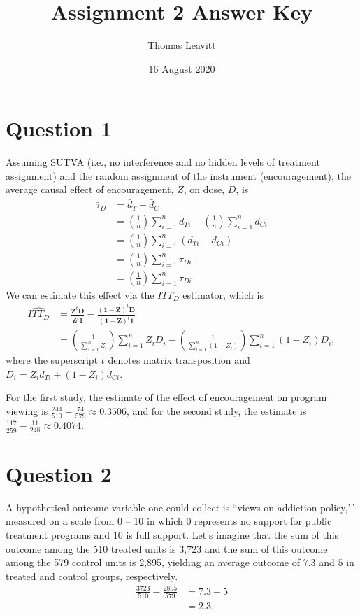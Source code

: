 \documentclass[
  12pt,
  leqno]{article}
\title{Assignment 2 Answer Key}
\author{\href{mailto:tl2624@columbia.edu}{Thomas Leavitt}}
\date{16 August 2020}
\DeclareMathOperator{\1}{\mathbbm{1}}
\begin{document}
\maketitle

\section*{Question 1}

Assuming SUTVA (i.e., no interference and no hidden levels of treatment
assignment) and the random assignment of the instrument (encouragement),
the average causal effect of encouragement, \(Z\), on dose, \(D\), is
\begin{align*}
\bar{\tau}_D & = \bar{d}_T - \bar{d}_C \\
& = \left(\frac{1}{n}\right) \sum \limits_{i = 1}^n d_{Ti} - \left(\frac{1}{n}\right) \sum \limits_{i = 1}^nd_{Ci} \\ 
& = \left(\frac{1}{n}\right) \sum \limits_{i = 1}^n \left(d_{Ti} - d_{Ci}\right) \\ 
& = \left(\frac{1}{n}\right) \sum \limits_{i = 1}^n \tau_{Di} \\
& = \left(\frac{1}{n}\right) \sum \limits_{i = 1}^n \tau_{Di}
\end{align*} We can estimate this effect via the \(ITT_D\) estimator,
which is \begin{align*}
\widehat{ITT_D} & = \frac{\mathbf{Z}^{t}\mathbf{D}}{\mathbf{Z}^{t}\mathbf{1}} - \frac{\left(\mathbf{1} - \mathbf{Z}\right)^{t}\mathbf{D}}{\left(\mathbf{1} - \mathbf{Z}\right)^{t}\mathbf{1}} \\ 
& = \left(\frac{1}{\sum_{i = 1}^n Z_i}\right) \sum_{i = 1}^n Z_i D_i - \left(\frac{1}{\sum_{i = 1}^n \left(1 - Z_i\right)}\right) \sum_{i = 1}^n \left(1 - Z_i\right) D_i,
\end{align*} where the superscript \(t\) denotes matrix transposition
and \(D_i = Z_i d_{Ti} + \left(1 - Z_i\right) d_{Ci}\).

For the first study, the estimate of the effect of encouragement on
program viewing is \(\frac{244}{510} - \frac{74}{579} \approx 0.3506\),
and for the second study, the estimate is
\(\frac{117}{259} - \frac{11}{248} \approx 0.4074\).

\section*{Question 2}

A hypothetical outcome variable one could collect is ``views on
addiction policy,'\,' measured on a scale from 0 -- 10 in which 0
represents no support for public treatment programs and 10 is full
support. Let's imagine that the sum of this outcome among the 510
treated units is 3,723 and the sum of this outcome among the 579 control
units is 2,895, yielding an average outcome of \(7.3\) and \(5\) in
treated and control groups, respectively. \begin{align*}
\frac{3723}{510} - \frac{2895}{579} & = 7.3 - 5 \\
& = 2.3.
\end{align*}
\end{document}

